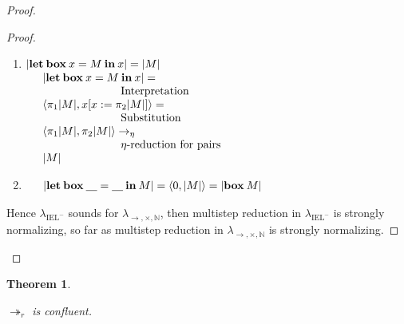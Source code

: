 \documentclass[a4paper]{article}
\newtheorem{theorem}{Theorem}
\begin{document}
\begin{proof}
\begin{proof}
\begin{enumerate}
\item $|{\bf let \: box \:} x = M {\: \bf in \:} x| = |M|$\\

  $\begin{array}{lll}
  &|{\bf let \: box \:} x = M {\: \bf in \:} x| = & \\
  &\quad\quad\quad\quad\quad\quad\quad \text{Interpretation}& \\
  &\langle \pi_1 |M|, x [x := \pi_2 |M|] \rangle = & \\
  &\quad\quad\quad\quad\quad\quad\quad \text{Substitution}& \\
  &\langle \pi_1 |M|, \pi_2 |M| \rangle \rightarrow_{\eta}& \\
  &\quad\quad\quad\quad\quad\quad\quad \text{$\eta$-reduction for pairs}& \\
  &|M|&
  \end{array}$

\item $\begin{array}{lll}
  &|{\bf let \: box \:} \underline{\quad} = \underline{\quad} {\: \bf in \:} M| = \langle 0 , |M| \rangle = |{\bf box \:} M|&
  \end{array}$
\end{enumerate}

  Hence $\lambda_{\text{IEL}^{-}}$ sounds for $\lambda_{\to, \times, \mathbb{N}}$,
  then multistep reduction in $\lambda_{\text{IEL}^{-}}$ is strongly normalizing, so far as multistep reduction in $\lambda_{\to, \times, \mathbb{N}}$ is strongly normalizing.

  \end{proof}
\end{proof}


\begin{theorem}
  $ $

  $\twoheadrightarrow_r$ is confluent.
\end{theorem}
\end{document}
